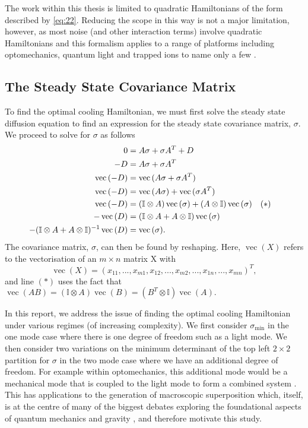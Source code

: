 \documentclass[11pt,a4paper]{article}
\numberwithin{equation}{section}
\DeclareMathOperator{\Vect}{vec}
\begin{document}
	The work within this thesis is limited to quadratic Hamiltonians of the form described by \ref{eq:22}. Reducing the scope in this way is not a major limitation, however, as most noise (and other interaction terms) involve quadratic Hamiltonians and this formalism applies to a range of platforms including optomechanics, quantum light and trapped ions to name only a few \cite{Serafini17}. 
	
	\subsection{The Steady State Covariance Matrix}
	\label{sec:sigmasolve}
	
	To find the optimal cooling Hamiltonian, we must first solve the steady state diffusion equation to find an expression for the steady state covariance matrix, $\sigma$. We proceed to solve for $\sigma$ as follows
	\begin{align}\label{eq:40}
	0 &= A\sigma +\sigma A^{T} + D&\notag\\
	-D &= A\sigma +\sigma A^{T}&\notag\\
	\Vect{(-D)} &= \Vect{(A\sigma +\sigma A^{T})}&\notag\\
	\Vect{(-D)} &= \Vect{(A\sigma)} + \Vect{(\sigma A^{T})}&\notag\\
	\Vect{(-D)} &= (\mathbb{I} \otimes A)\Vect{(\sigma)} + (A \otimes \mathbb{I})\Vect{(\sigma)}\quad(*)\notag&\\
	-\Vect{(D)} &= (\mathbb{I} \otimes A + A \otimes \mathbb{I}) \Vect{(\sigma)}\notag&\\
	-(\mathbb{I} \otimes A + A \otimes \mathbb{I})^{-1}\Vect{(D)} &= \Vect{(\sigma)}.&
	\end{align}
	The covariance matrix, $\sigma$, can then be found by reshaping.
	Here, $\Vect(X)$ refers to the vectorisation of an $m \times n$ matrix X with
	\begin{equation*}
	\Vect(X)= (x_{11}, ..., x_{m1}, x_{12}, ..., x_{m2}, ..., x_{1n}, ..., x_{mn})^T ,
	\end{equation*}
	and line $(*)$ uses the fact that $\Vect{(AB)}=(\mathbb{I} \otimes A)\Vect{(B)}=(B^{T} \otimes \mathbb{I})\Vect{(A)}.$

	In this report, we address the issue of finding the optimal cooling Hamiltonian under various regimes (of increasing complexity). We first consider $\sigma_\text{min}$ in the one mode case where there is one degree of freedom such as a light mode. We then consider two variations on the minimum determinant of the top left $2 \times 2$ partition for $\sigma$ in the two mode case where we have an additional degree of freedom. For example within optomechanics, this additional mode would be a mechanical mode that is coupled to the light mode to form a combined system \cite{Aspelmeyer}. This has applications to the generation of macroscopic superposition \cite{Hoff} which, itself, is at the centre of many of the biggest debates exploring the foundational aspects of quantum mechanics and gravity \cite{Pikovski}, and therefore motivate this study.	
	
\end{document}
